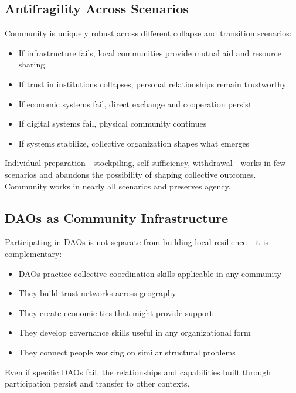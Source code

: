 \documentclass[12pt,a4paper]{article}
\begin{document}
\subsection{Antifragility Across Scenarios}

Community is uniquely robust across different collapse and transition scenarios:

\begin{itemize}
    \item If infrastructure fails, local communities provide mutual aid and resource sharing
    \item If trust in institutions collapses, personal relationships remain trustworthy
    \item If economic systems fail, direct exchange and cooperation persist
    \item If digital systems fail, physical community continues
    \item If systems stabilize, collective organization shapes what emerges
\end{itemize}

Individual preparation—stockpiling, self-sufficiency, withdrawal—works in few scenarios and abandons the possibility of shaping collective outcomes. Community works in nearly all scenarios and preserves agency.

\subsection{DAOs as Community Infrastructure}

Participating in DAOs is not separate from building local resilience—it is complementary:

\begin{itemize}
    \item DAOs practice collective coordination skills applicable in any community
    \item They build trust networks across geography
    \item They create economic ties that might provide support
    \item They develop governance skills useful in any organizational form
    \item They connect people working on similar structural problems
\end{itemize}

Even if specific DAOs fail, the relationships and capabilities built through participation persist and transfer to other contexts.
\end{document}
